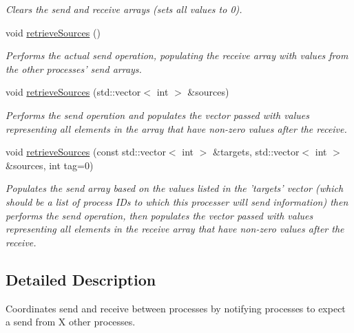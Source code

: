 \begin{DoxyCompactItemize}
\begin{DoxyCompactList}\small\item\em Clears the send and receive arrays (sets all values to 0). \end{DoxyCompactList}\item 
\hypertarget{class_s_r_manager_a1495a7bcdc3143fcf53f84d8c2ad3564}{void \hyperlink{class_s_r_manager_a1495a7bcdc3143fcf53f84d8c2ad3564}{retrieve\-Sources} ()}\label{class_s_r_manager_a1495a7bcdc3143fcf53f84d8c2ad3564}

\begin{DoxyCompactList}\small\item\em Performs the actual send operation, populating the receive array with values from the other processes' send arrays. \end{DoxyCompactList}\item 
void \hyperlink{class_s_r_manager_a81c5c4d393d6b175c4345254d930b227}{retrieve\-Sources} (std\-::vector$<$ int $>$ \&sources)
\begin{DoxyCompactList}\small\item\em Performs the send operation and populates the vector passed with values representing all elements in the array that have non-\/zero values after the receive. \end{DoxyCompactList}\item 
void \hyperlink{class_s_r_manager_a20144682ab9f692aca5422ab807c4475}{retrieve\-Sources} (const std\-::vector$<$ int $>$ \&targets, std\-::vector$<$ int $>$ \&sources, int tag=0)
\begin{DoxyCompactList}\small\item\em Populates the send array based on the values listed in the 'targets' vector (which should be a list of process I\-Ds to which this processer will send information) then performs the send operation, then populates the vector passed with values representing all elements in the receive array that have non-\/zero values after the receive. \end{DoxyCompactList}\end{DoxyCompactItemize}


\subsection{Detailed Description}
Coordinates send and receive between processes by notifying processes to expect a send from X other processes. 

